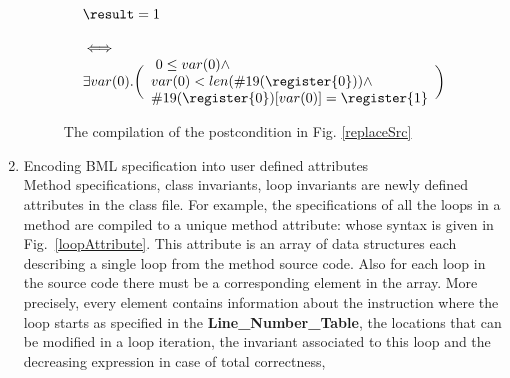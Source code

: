 \begin{enumerate}
\begin{figure}[t]
 $$\begin{array}{l}
         \result = 1 \\
          \\ 
         \iff \\ 
         \exists  var(0) .
           \biggl(\begin{array}{l} \ 0 \leq var(0) \wedge\\ 
             var(0) < len(\#19(\register{0})) \wedge \\
             \#19(\register{0})[var(0)] = \register{1} 
         \end{array} \biggr) 
   \end{array}
$$
\caption{\sc The compilation of the postcondition in Fig. \ref{replaceSrc}}
\label{postCompile}
\end{figure}





\item Encoding BML specification  into user defined attributes\\
 Method specifications, class invariants, loop invariants are newly defined attributes in the class file.
 For example, the specifications of all the loops in a method are compiled to a unique method attribute: whose syntax is
 given in Fig.~\ref{loopAttribute}. This attribute is an array of data structures each describing a single loop from the method source code.
 Also for each loop in the source code there must be a corresponding element in the array. 
More precisely, every element contains information about the instruction where the loop starts as specified in the
\textbf{Line\_Number\_Table}, the locations that can be modified in a loop iteration, 
 the invariant associated to this loop and the decreasing expression in case of total correctness, 
\end{enumerate}


